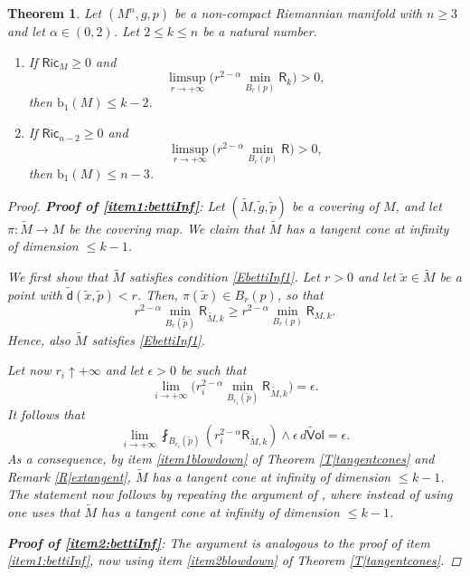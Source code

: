 \documentclass[10pt]{article}
\newtheorem{thm}{Theorem}[section]
\theoremstyle{definition}
\newcommand{\ssf}[1]{\mathsf{#1}}
\newcommand{\Ric}{\mathsf{Ric}}
\newcommand{\sd}{\mathsf{d}}
\newcommand{\R}{\mathsf{R}}
\begin{document}
\begin{thm} 
    Let $(M^n,g,p)$ be a non-compact Riemannian manifold with $n \geq 3$ and let $\alpha \in (0,2)$. Let $2 \leq k \leq n$ be a natural number.
    \begin{enumerate}
        \item \label{item1:bettiInf}
        If $\Ric_M \geq 0$ and
    \begin{equation} \label{EbettiInf1}
    \limsup_{r \to + \infty} \Big( r^{2-\alpha} \min_{B_r(p)} \R_k \Big) >0,
    \end{equation}
    then $\mathrm{b}_1(M) \leq k-2$. 
    \item \label{item2:bettiInf}
    If $\Ric_{n-2} \geq 0$ and
    \begin{equation} \label{EbettiInf2}
    \limsup_{r \to + \infty} \Big( r^{2-\alpha} \min_{B_r(p)} \R \Big) >0,
    \end{equation}
    then $\mathrm{b}_1(M) \leq n-3$.
    \end{enumerate}
    \begin{proof}
    \textbf{Proof of \ref{item1:bettiInf}}: Let $(\tilde{M},\tilde{g},\tilde{p})$ be a covering of $M$, and let $\pi:\tilde{M} \to M$ be the covering map. We claim that $\tilde{M}$ has a tangent cone at infinity of dimension $\leq k-1$.

    We first show that $\tilde{M}$
    satisfies condition \eqref{EbettiInf1}. Let $r>0$ and let $\tilde{x} \in \tilde{M}$ be a point with $\tilde{\sd}(\tilde{x},\tilde{p}) < r$. Then, $\pi(\tilde{x}) \in B_r(p)$, so that
    \[
    r^{2-\alpha} \min_{B_{r}(\tilde{p}) }\R_{\tilde{M},k} \geq r^{2-\alpha} \min_{B_{r}(p) }\R_{M,k}.
    \]
    Hence, also $\tilde{M}$ satisfies \eqref{EbettiInf1}.
    
    Let now $r_i \uparrow + \infty$ and let $\epsilon>0$ be such that 
    \begin{equation*}
    \lim_{i \to + \infty} \Big( r_i^{2-\alpha} \min_{B_{r_i}(\tilde{p})} \R_{\tilde{M},k} \Big) =\epsilon.
    \end{equation*}
    It follows that
    \[
    \lim_{i \to + \infty} \fint_{B_{r_i}(\tilde{p})} (r_i^{2-\alpha}\R_{\tilde{M},k}) \wedge \epsilon \, \widetilde{d\ssf{Vol}}=\epsilon.
    \]
    As a consequence, by item \ref{item1blowdown} of Theorem \ref{T|tangentcones} and Remark \ref{R|extangent}, $\tilde{M}$ has a tangent cone at infinity of dimension $\leq k-1$.
    The statement now follows by repeating the argument of \cite[Theorem 1.3]{zhu2024twodimensionvanishingsplittingpositive}, where instead of using \cite[Theorem 1.6]{zhu2024twodimensionvanishingsplittingpositive} one uses that $\tilde{M}$ has a tangent cone at infinity of dimension $\leq k-1$.

    \textbf{Proof of \ref{item2:bettiInf}}: The argument is analogous to the proof of item \ref{item1:bettiInf}, now using item \ref{item2blowdown} of Theorem \ref{T|tangentcones}.
    \end{proof}
    \end{thm}
\end{document}
